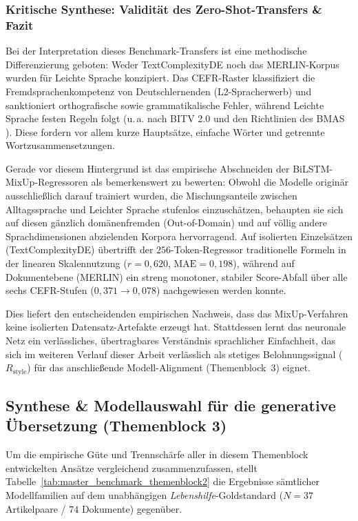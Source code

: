\subsubsection{Kritische Synthese: Validität des Zero-Shot-Transfers \& Fazit}
\label{sec:synthese_abstufung_fazit}

Bei der Interpretation dieses Benchmark-Transfers ist eine methodische Differenzierung geboten: Weder TextComplexityDE noch das MERLIN-Korpus wurden für Leichte Sprache konzipiert. Das CEFR-Raster klassifiziert die Fremdsprachenkompetenz von Deutschlernenden (L2-Spracherwerb) und sanktioniert orthografische sowie grammatikalische Fehler, während Leichte Sprache festen Regeln folgt (u.\,a. nach BITV 2.0 \citep{bitv2019} und den Richtlinien des BMAS \citep{bmas2025ratgeber}). Diese fordern vor allem kurze Hauptsätze, einfache Wörter und getrennte Wortzusammensetzungen.

Gerade vor diesem Hintergrund ist das empirische Abschneiden der BiLSTM-MixUp-Regressoren als bemerkenswert zu bewerten: Obwohl die Modelle originär ausschließlich darauf trainiert wurden, die Mischungsanteile zwischen Alltagssprache und Leichter Sprache stufenlos einzuschätzen, behaupten sie sich auf diesen gänzlich domänenfremden (Out-of-Domain) und auf völlig andere Sprachdimensionen abzielenden Korpora hervorragend. Auf isolierten Einzelsätzen (TextComplexityDE) übertrifft der $256$-Token-Regressor traditionelle Formeln in der linearen Skalennutzung ($r = 0{,}620$, $\text{MAE} = 0{,}198$), während auf Dokumentebene (MERLIN) ein streng monotoner, stabiler Score-Abfall über alle sechs CEFR-Stufen ($0{,}371 \to 0{,}078$) nachgewiesen werden konnte.

Dies liefert den entscheidenden empirischen Nachweis, dass das MixUp-Verfahren keine isolierten Datensatz-Artefakte erzeugt hat. Stattdessen lernt das neuronale Netz ein verlässliches, übertragbares Verständnis sprachlicher Einfachheit, das sich im weiteren Verlauf dieser Arbeit verlässlich als stetiges Belohnungssignal ($R_{\text{style}}$) für das anschließende Modell-Alignment (Themenblock~3) eignet.

\subsection{Synthese \& Modellauswahl für die generative Übersetzung (Themenblock 3)}
\label{sec:synthese_modellauswahl_themenblock3}

Um die empirische Güte und Trennschärfe aller in diesem Themenblock entwickelten Ansätze vergleichend zusammenzufassen, stellt Tabelle~\ref{tab:master_benchmark_themenblock2} die Ergebnisse sämtlicher Modellfamilien auf dem unabhängigen \textit{Lebenshilfe}-Goldstandard ($N = 37$ Artikelpaare / $74$ Dokumente) gegenüber.


